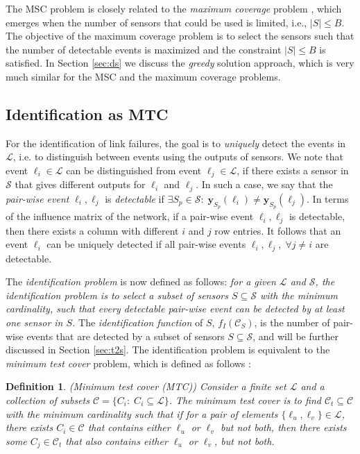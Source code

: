 \documentclass[twocolumn]{autart}
\newtheorem{definition}{\bf Definition}[section]
\begin{document}
The MSC problem is closely related to the \textit{maximum coverage} problem \cite{vazirani2013approximation}, which emerges when the number of sensors that could be used is limited, i.e., $|S|\le B$. The objective of the maximum coverage problem is to select the sensors such that the number of detectable events is maximized and the constraint $|S|\le B$ is satisfied. In Section \ref{sec:ds} we discuss the \textit{greedy} solution approach, which is very much similar for the MSC and the maximum coverage problems.






\subsection{Identification as MTC}\vspace{-0.35cm}
\label{sec:Ident_as_MTC}
For the identification of link failures, the goal is to \textit{uniquely} detect the events in $\mathcal{L}$, i.e. to distinguish between events using the outputs of sensors. We note that event $\ell_i\in\mathcal{L}$ can be distinguished from event $\ell_j\in\mathcal{L}$, if there exists a sensor in $\mathcal{S}$ that gives different outputs for $\ell_i$ and $\ell_j$. In such a case, we say that the \textit{pair-wise event} $\ell_i,\ell_j$ is \textit{detectable} if $\exists S_p\in\mathcal{S}:\;\mathbf{y}_{S_p}(\ell_i)\ne\mathbf{y}_{S_p}(\ell_j)$. In terms of the influence matrix of the network, if a pair-wise event $\ell_i,\ell_j$ is detectable, then there exists a column with different $i$ and $j$ row entries. It follows that an event $\ell_i$ can be uniquely detected if all pair-wise events $\ell_i,\ell_j, \;\forall j\ne i$ are detectable. 

The \textit{identification problem} is now defined as follows: 
\textit{for a given $\mathcal{L}$ and $\mathcal{S}$, the identification problem is to select a subset of sensors $S\subseteq\mathcal{S}$ with the minimum cardinality, such that every detectable pair-wise event can be detected by at least one sensor in $S$.} The \textit{identification function} of $S$,  $f_I(\mathcal{C}_S)$, is the number of pair-wise events that are detected by a subset of sensors $S\subseteq \mathcal{S}$, and will be further discussed in Section \ref{sec:t2s}. 
The identification problem is equivalent to the \textit{minimum test cover} problem, which is defined as follows \cite{Bontriddr1}:\vspace{-0.15cm}


\begin{definition} (Minimum test cover (MTC))
\label{def:test_cover}
Consider a finite set $\mathcal{L}$ and a collection of subsets $\mathcal{C}=\{C_i: \;C_i\subseteq\mathcal{L}\}$. The minimum test cover is to find $\mathcal{C}_t\subseteq\mathcal{C}$ with the minimum cardinality such that if for a pair of elements $\{\ell_u,\ell_v\} \in\mathcal{L}$, there exists ${C}_i\in\mathcal{C}$ that contains either $\ell_u$ or $\ell_v$ but not both, then there exists some ${C}_j\in\mathcal{C}_t$ that also contains either $\ell_u$ or $\ell_v$, but not both.
\end{definition}
\end{document}
